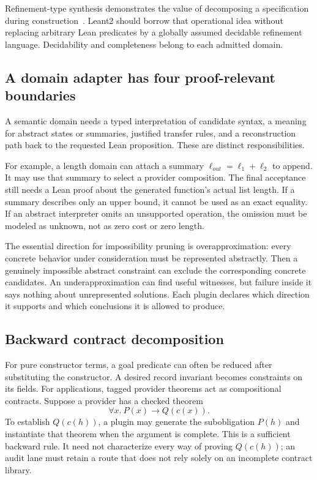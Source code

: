 Refinement-type synthesis demonstrates the value of decomposing a specification during construction~\cite{synquid}. Leant2 should borrow that operational idea without replacing arbitrary Lean predicates by a globally assumed decidable refinement language. Decidability and completeness belong to each admitted domain.

\subsection{A domain adapter has four proof-relevant boundaries}
A semantic domain needs a typed interpretation of candidate syntax, a meaning for abstract states or summaries, justified transfer rules, and a reconstruction path back to the requested Lean proposition. These are distinct responsibilities.

For example, a length domain can attach a summary $\ell_{out}=\ell_1+\ell_2$ to append. It may use that summary to select a provider composition. The final acceptance still needs a Lean proof about the generated function's actual list length. If a summary describes only an upper bound, it cannot be used as an exact equality. If an abstract interpreter omits an unsupported operation, the omission must be modeled as unknown, not as zero cost or zero length.

The essential direction for impossibility pruning is overapproximation: every concrete behavior under consideration must be represented abstractly. Then a genuinely impossible abstract constraint can exclude the corresponding concrete candidates. An underapproximation can find useful witnesses, but failure inside it says nothing about unrepresented solutions. Each plugin declares which direction it supports and which conclusions it is allowed to produce.

\subsection{Backward contract decomposition}
For pure constructor terms, a goal predicate can often be reduced after substituting the constructor. A desired record invariant becomes constraints on its fields. For applications, tagged provider theorems act as compositional contracts. Suppose a provider has a checked theorem
\[
 \forall x.\ P(x)\to Q(c(x)).
\]
To establish $Q(c(h))$, a plugin may generate the subobligation $P(h)$ and instantiate that theorem when the argument is complete. This is a sufficient backward rule. It need not characterize every way of proving $Q(c(h))$; an audit lane must retain a route that does not rely solely on an incomplete contract library.

